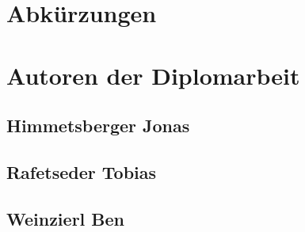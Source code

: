 
\section{Abkürzungen}
\section{Autoren der Diplomarbeit}
\subsection{Himmetsberger Jonas}
\subsection{Rafetseder Tobias}
\subsection{Weinzierl Ben}
